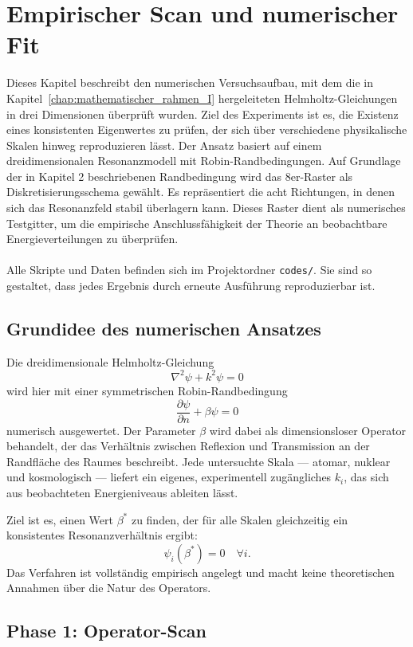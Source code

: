 \chapter{Empirischer Scan und numerischer Fit}
\label{chap:empirischer_fit}

Dieses Kapitel beschreibt den numerischen Versuchsaufbau, mit dem die in Kapitel~\ref{chap:mathematischer_rahmen_I}
hergeleiteten Helmholtz-Gleichungen in drei Dimensionen überprüft wurden.  
Ziel des Experiments ist es, die Existenz eines konsistenten Eigenwertes
zu prüfen, der sich über verschiedene physikalische Skalen hinweg reproduzieren lässt.
Der Ansatz basiert auf einem dreidimensionalen Resonanzmodell mit Robin-Randbedingungen. Auf Grundlage der in Kapitel 2 beschriebenen Randbedingung
wird das 8er-Raster als Diskretisierungsschema gewählt. Es repräsentiert die acht Richtungen, in denen sich das Resonanzfeld stabil überlagern kann. Dieses Raster dient als numerisches Testgitter, um die empirische Anschlussfähigkeit der Theorie an beobachtbare Energieverteilungen zu überprüfen.
\\
\\
Alle Skripte und Daten befinden sich im Projektordner \texttt{codes/}.  
Sie sind so gestaltet, dass jedes Ergebnis durch erneute Ausführung reproduzierbar ist.

\section{Grundidee des numerischen Ansatzes}

Die dreidimensionale Helmholtz-Gleichung
\[
  \nabla^2 \psi + k^2 \psi = 0
\]
wird hier mit einer symmetrischen Robin-Randbedingung
\[
  \frac{\partial \psi}{\partial n} + \beta \psi = 0
\]
numerisch ausgewertet.  
Der Parameter $\beta$ wird dabei als dimensionsloser Operator behandelt, der das
Verhältnis zwischen Reflexion und Transmission an der Randfläche des Raumes beschreibt.
Jede untersuchte Skala — atomar, nuklear und kosmologisch — liefert ein eigenes,
experimentell zugängliches $k_i$, das sich aus beobachteten Energieniveaus ableiten lässt.

Ziel ist es, einen Wert $\beta^*$ zu finden, der für alle Skalen gleichzeitig
ein konsistentes Resonanzverhältnis ergibt:
\[
  \psi_i(\beta^*) = 0 \quad \forall i.
\]
Das Verfahren ist vollständig empirisch angelegt und macht keine theoretischen
Annahmen über die Natur des Operators.
\\
\newpage
\section{Phase 1: Operator-Scan}
\label{sec:scan}


